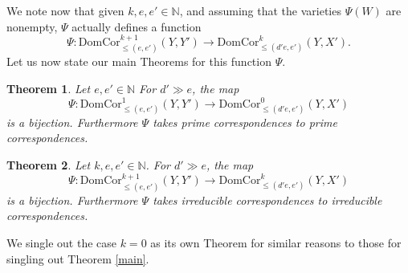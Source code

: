 \documentclass[12pt]{amsart}
\numberwithin{equation}{section}
\newtheorem{theorem}{Theorem}
\numberwithin{theorem}{section}
\theoremstyle{definition}
\theoremstyle{definition}
\def\NN{{\mathbb N}}
\def \DC{{\mathrm{DomCor}}}
\begin{document}
We note now that given $k,e,e' \in \NN$, and assuming that the varieties $\Psi(W)$ are nonempty,  $\Psi$ actually defines a function $$\Psi : \DC^{k+1}_{\le (e,e')} (Y,Y') \to \DC^{k}_{\le (d'e,e')} (Y, X').$$ 
Let us now state our main Theorems for this function $\Psi.$
\begin{theorem}\label{mainpsi}
Let $e,e' \in \NN$
    For $d'\gg e$, the map  $$\Psi: \DC^1_{\le (e,e')} (Y,Y') \to \DC^{0}_{\le (d'e,e')} (Y, X')$$  is a bijection.
    Furthermore $\Psi$ takes prime correspondences to prime correspondences.
\end{theorem}

\begin{theorem}\label{mainpsik}
Let $k ,e, e' \in \NN$.
For $d'\gg e$, the map  $$\Psi: \DC^{k+1}_{\le (e,e')} (Y,Y') \to \DC^{k}_{\le (d'e,e')} (Y, X')$$  is a bijection.
Furthermore $\Psi$ takes irreducible correspondences to irreducible correspondences.
\end{theorem}

We single out the case $k=0$ as its own Theorem for similar reasons to those for singling out Theorem \ref{main}.
\end{document}
